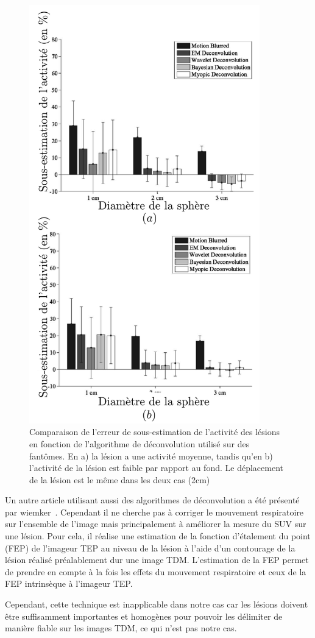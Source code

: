 \begin{figure}[h!]
	\begin{center}
		\includegraphics[width=10cm]{images/performanceDeconvolution}
	\end{center}
	\caption{Comparaison de l'erreur de sous-estimation de l'activité des lésions en fonction de l'algorithme de déconvolution utilisé sur des fantômes. En a) la lésion a une activité moyenne, tandis qu'en b) l'activité de la lésion est faible par rapport au fond. Le déplacement de la lésion est le même dans les deux cas (2cm)} 
	\label{fig:performanceDeconvolution}
\end{figure}


Un autre article utilisant aussi des algorithmes de déconvolution a été présenté par wiemker~\cite{wiemker2008combined}. Cependant il ne cherche pas à corriger le mouvement respiratoire sur l'ensemble de l'image mais principalement à améliorer la mesure du SUV sur une lésion. Pour cela, il réalise une estimation de la fonction d'étalement du point (FEP) de l'imageur TEP au niveau de la lésion à l'aide d'un contourage de la lésion réalisé préalablement dur une image TDM. L'estimation de la FEP permet de prendre en compte à la fois les effets du mouvement respiratoire et ceux de la FEP intrinsèque à l'imageur TEP. 

Cependant, cette technique est inapplicable dans notre cas car les lésions doivent être suffisamment importantes et homogènes pour pouvoir les délimiter de manière fiable sur les images TDM, ce qui n'est pas notre cas.
